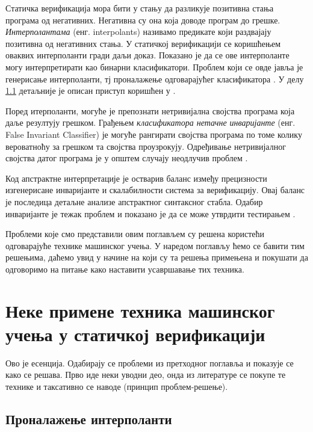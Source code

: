 \documentclass[a4paper]{article}
\begin{document}
{Статичка верификација мора бити у стању да разликује позитивна стања програма од негативних.
Негативна су она која доводе програм до грешке. \textit{Интерполантама} (енг. interpolants)
називамо предикате који раздвајају позитивна од негативних стања.
У статичкој верификацији се коришћењем оваквих интерполанти гради даљи доказ.
Показано је да се ове интерполанте могу интерпретирати као бинарни класификатори.
Проблем који се овде јавља је генерисање интерполанти, тј проналажење одговарајућег класификатора \cite{Sharma_interpolantsas}.
У делу  \ref{ssec:interpolant} детаљније је описан приступ коришћен у \cite{Sharma_interpolantsas}.

Поред итерполанти, могуће је препознати нетривијална својства програма која даље резултују грешком.
Грађењем \textit{класификатора нетачне инваријанте} (енг. False Invariant Classifier) је могуће рангирати
својства програма по томе колику вероватноћу за грешком та својства проузрокују.
Одређивање нетривијалног својства датог програма је у општем случају неодлучив проблем \cite{turing, Brun04findinglatent}.

Код апстрактне интерпретације је остварив баланс између прецизности изгенерисане инваријанте и скалабилности система за верификацију. Овај баланс је последица детаљне анализе апстрактног синтаксног стабла. Одабир инваријанте је тежак проблем и показано је да се може утврдити тестирањем \cite{Sharma_interpolantsas, KrishnaPW15}.

Проблеми које смо представили овим поглављем су решена користећи одговарајуће технике машинског учења. У наредом поглављу ћемо се бавити тим решењима, даћемо увид у начине на који су та решења примењена и покушати да одговоримо на питање како наставити усавршавање тих техника.

\section{Неке примене техника машинског учења у статичкој верификацији}
\color{blue}
Ово је есенција. Одабирају се проблеми из претходног поглавља и показује се
како се решава. Прво иде неки уводни део, онда из литературе се покупе те технике
и таксативно се наводе (принцип проблем-решење).
\color{black}
\subsection{Проналажење интерполанти}
\label{ssec:interpolant}

}
\end{document}
